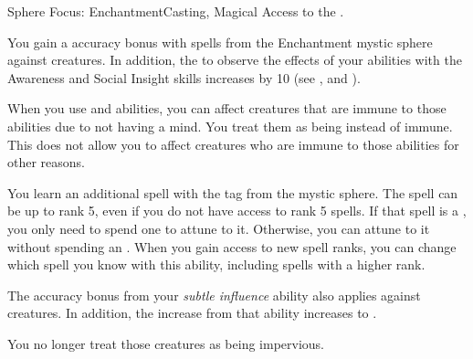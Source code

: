    \begin{magicalfeat}{Sphere Focus: Enchantment}{Casting, Magical}
        \featpre Access to the  .

         You gain a  accuracy bonus with spells from the Enchantment mystic sphere against \unaware creatures.
        In addition, the  to observe the effects of your  abilities with the Awareness and Social Insight skills increases by 10 (see , and ).

         When you use  and  abilities, you can affect creatures that are immune to those abilities due to not having a mind.
        You treat them as being \impervious instead of immune.
        This does not allow you to affect creatures who are immune to those abilities for other reasons.

         You learn an additional spell with the  tag from the  mystic sphere.
        The spell can be up to rank 5, even if you do not have access to rank 5 spells.
        If that spell is a , you only need to spend one  to attune to it.
        Otherwise, you can attune to it without spending an .
        When you gain access to new spell ranks, you can change which spell you know with this ability, including spells with a higher rank.

         The accuracy bonus from your \textit{subtle influence} ability also applies against \partiallyunaware creatures.
        In addition, the  increase from that ability increases to .

         You no longer treat those creatures as being impervious.
    \end{magicalfeat}

